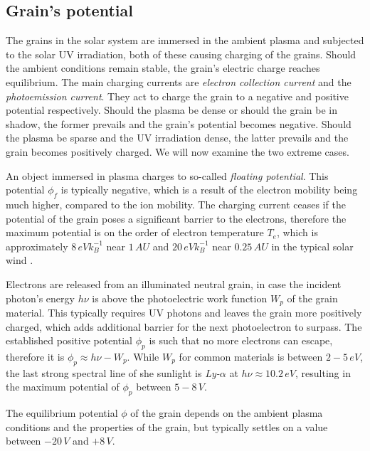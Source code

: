 \subsection{Grain's potential}

The grains in the solar system are immersed in the ambient plasma and subjected to the solar UV irradiation, both of these causing charging of the grains. Should the ambient conditions remain stable, the grain's electric charge reaches equilibrium. The main charging currents are \textit{electron collection current} and the \textit{photoemission current}. They act to charge the grain to a negative and positive potential respectively. Should the plasma be dense or should the grain be in shadow, the former prevails and the grain's potential becomes negative. Should the plasma be sparse and the UV irradiation dense, the latter prevails and the grain becomes positively charged. We will now examine the two extreme cases. 

An object immersed in plasma charges to so-called \textit{floating potential}. This potential $\phi_{f}$ is typically negative, which is a result of the electron mobility being much higher, compared to the ion mobility. The charging current ceases if the potential of the grain poses a significant barrier to the electrons, therefore the maximum potential is on the order of electron temperature $T_e$, which is approximately $8 \, \si{eV k_B^{-1}}$ near $1 \, \si{AU}$ and $20 \, \si{eV k_B^{-1}}$ near $0.25 \, \si{AU}$ in the typical solar wind \citep{guillemant2013simulation}. 

Electrons are released from an illuminated neutral grain, in case the incident photon's energy $h\nu$ is above the photoelectric work function $W_{p}$ of the grain material. This typically requires UV photons and leaves the grain more positively charged, which adds additional barrier for the next photoelectron to surpass. The established positive potential $\phi_{p}$ is such that no more electrons can escape, therefore it is $\phi_{p} \approx h\nu - W_{p}$. While $W_p$ for common materials is between $2 - 5 \, \si{eV}$, the last strong spectral line of she sunlight is \textit{Ly-$\alpha$} at $h\nu \approx 10.2 \, \si{eV}$, resulting in the maximum potential of $\phi_p$ between $5 - 8 \, \si{V}$. 

The equilibrium potential $\phi$ of the grain depends on the ambient plasma conditions and the properties of the grain, but typically settles on a value between $-20 \, \si{V}$ and $+8 \, \si{V}$. 

